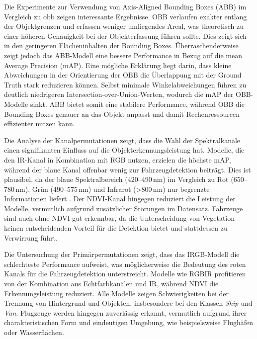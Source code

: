 Die Experimente zur Verwendung von Axis-Aligned Bounding Boxes (ABB) im Vergleich zu \acrfull{obb} zeigen interessante Ergebnisse. OBB verlaufen exakter entlang der Objektgrenzen und erfassen weniger umliegendes Areal, was theoretisch zu einer höheren Genauigkeit bei der Objekterfassung führen sollte. Dies zeigt sich in den geringeren Flächeninhalten der Bounding Boxes. Überraschenderweise zeigt jedoch das ABB-Modell eine bessere Performance in Bezug auf die mean Average Precision (mAP). Eine mögliche Erklärung liegt darin, dass kleine Abweichungen in der Orientierung der OBB die Überlappung mit der Ground Truth stark reduzieren können. Selbst minimale Winkelabweichungen führen zu deutlich niedrigeren Intersection-over-Union-Werten, wodurch die mAP der OBB-Modelle sinkt. ABB bietet somit eine stabilere Performance, während OBB die Bounding Boxes genauer an das Objekt anpasst und damit Rechenressourcen effizienter nutzen kann. 

Die Analyse der Kanalpermutationen zeigt, dass die Wahl der Spektralkanäle einen signifikanten Einfluss auf die Objekterkennungsleistung hat. Modelle, die den IR-Kanal in Kombination mit RGB nutzen, erzielen die höchste mAP, während der blaue Kanal offenbar wenig zur Fahrzeugdetektion beiträgt. Dies ist plausibel, da der blaue Spektralbereich (420–490\,nm) im Vergleich zu Rot (650–780\,nm), Grün (490–575\,nm) und Infrarot (>800\,nm) nur begrenzte Informationen liefert . Der NDVI-Kanal hingegen reduziert die Leistung der Modelle, vermutlich aufgrund zusätzlicher Störungen im Datensatz. Fahrzeuge sind auch ohne NDVI gut erkennbar, da die Unterscheidung von Vegetation keinen entscheidenden Vorteil für die Detektion bietet und stattdessen zu Verwirrung führt. 

Die Untersuchung der Primärpermutationen zeigt, dass das IRGB-Modell die schlechteste Performance aufweist, was möglicherweise die Bedeutung des roten Kanals für die Fahrzeugdetektion unterstreicht. Modelle wie RGBIR profitieren von der Kombination aus Echtfarbkanälen und IR, während NDVI die Erkennungsleistung reduziert. Alle Modelle zeigen Schwierigkeiten bei der Trennung von Hintergrund und Objekten, insbesondere bei den Klassen \emph{Ship} und \emph{Van}. Flugzeuge werden hingegen zuverlässig erkannt, vermutlich aufgrund ihrer charakteristischen Form und eindeutigen Umgebung, wie beispielsweise Flughäfen oder Wasserflächen. 

